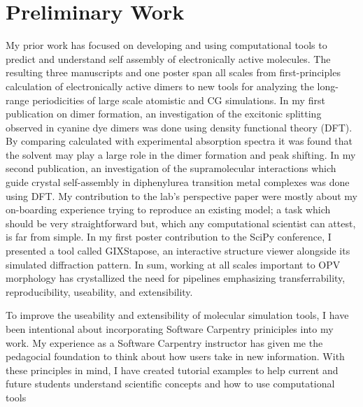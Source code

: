 \section*{Preliminary Work}

My prior work has focused on developing and using computational tools to predict and understand self assembly of electronically active molecules.
The resulting three manuscripts and one poster span all scales from first-principles calculation of electronically active dimers to new tools for analyzing the long-range periodicities of large scale atomistic and CG simulations.
In my first publication on dimer formation, an investigation of the excitonic splitting observed in cyanine dye dimers was done using density functional theory (DFT)\cite{Fothergill2018}.
By comparing calculated with experimental absorption spectra it was found that the solvent may play a large role in the dimer formation and peak shifting.
In my second publication, an investigation of the supramolecular interactions which guide crystal self-assembly in diphenylurea transition metal complexes was done using DFT\cite{Millard2019a}. 
My contribution to the lab's perspective paper were mostly about my on-boarding experience trying to reproduce an existing model; a task which should be very straightforward but, which any computational scientist can attest, is far from simple\cite{Jankowski2019}. 
In my first poster contribution to the SciPy conference, I presented a tool called GIXStapose, an interactive structure viewer alongside its simulated diffraction pattern\cite{gixstapose, scipy2020}.
In sum, working at all scales important to OPV morphology has crystallized the need for pipelines emphasizing transferrability, reproducibility, useability, and extensibility.

To improve the useability and extensibility of molecular simulation tools, I have been intentional about incorporating Software Carpentry priniciples into my work\cite{swc-main}.
My experience as a Software Carpentry instructor has given me the pedagocial foundation to think about how users take in new information.
With these principles in mind, I have created tutorial examples to help current and future students understand scientific concepts and how to use computational tools\cite{notebooktutorials}

